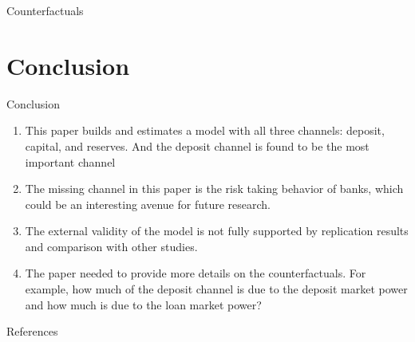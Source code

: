 \documentclass{beamer}
\begin{document}
\begin{frame}{Counterfactuals}

    \begin{table}
    \end{table}
\end{frame}

\section{Conclusion}
\begin{frame}{Conclusion}
    \begin{enumerate}
        \item This paper builds and estimates a model with all three channels: deposit, capital, and reserves. And the deposit channel is found to be the most important channel
        \item The missing channel in this paper is the risk taking behavior of banks, which could be an interesting avenue for future research.
        \item The external validity of the model is not fully supported by replication results and comparison with other studies.
        \item The paper needed to provide more details on the counterfactuals. For example, how much of the deposit channel is due to the deposit market power and how much is due to the loan market power?
    \end{enumerate}
\end{frame}

\scriptsize 
\begin{frame}[allowframebreaks]{References}
    
    
\end{frame}
	
\normalsize
\end{document}
